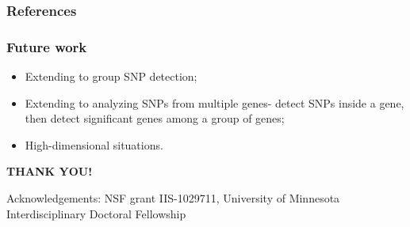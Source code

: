 \documentclass[handout,10pt]{beamer}
\begin{document}

\begin{frame}
\frametitle{References}

{\scriptsize


}
\end{frame}


\begin{frame}
\frametitle{Future work}
\begin{itemize}
\item Extending to group SNP detection;

\item Extending to analyzing SNPs from multiple genes- detect SNPs inside a gene, then detect significant genes among a group of genes;

\item High-dimensional situations.
\end{itemize}

\end{frame}

\begin{frame}
\centering\huge
\textcolor{UniBlue}{\textbf{THANK YOU!}}

\vspace{-.5em}
{\scriptsize Acknowledgements: NSF grant IIS-1029711, University of Minnesota Interdisciplinary Doctoral Fellowship}
\end{frame}

\end{document}
